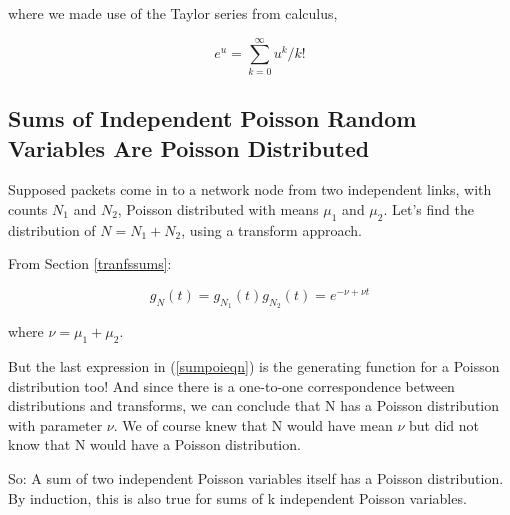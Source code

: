 where we made use of the Taylor series from calculus,

\begin{equation}
e^u =  \sum_{k=0}^{\infty} u^k/k!
\end{equation}

\subsection{Sums of Independent Poisson Random Variables Are Poisson
Distributed}
\label{sumpoi}

Supposed packets come in to a network node from two independent links,
with counts $N_1$ and $N_2$, Poisson distributed with means $\mu_1$ and
$\mu_2$.  Let's find the distribution of $N = N_1+N_2$, using a
transform approach.

From Section \ref{tranfssums}:

\begin{equation}
\label{sumpoieqn}
g_N(t) = g_{N_1}(t) g_{N_2}(t) = e^{-\nu + \nu t}
\end{equation}

where $\nu = \mu_1 + \mu_2$.

But the last expression in (\ref{sumpoieqn}) is the generating function for
a Poisson distribution too!  And since there is a one-to-one
correspondence between distributions and transforms, we can conclude
that N has a Poisson distribution with parameter $\nu$.  We of
course knew that N would have mean $\nu$ but did not know that N would
have a Poisson distribution.

So:  A sum of two independent Poisson variables itself has a Poisson
distribution.  By induction, this is also true for sums of k independent
Poisson variables.

